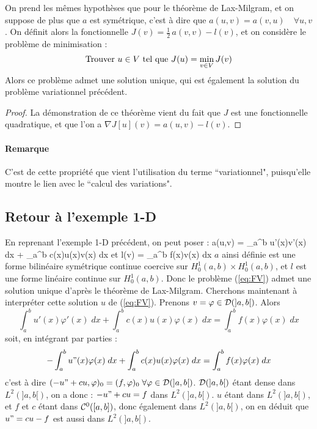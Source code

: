 %
%
\begin{theorem}
  On prend les mêmes hypothèses que pour le théorème de Lax-Milgram,
  et on suppose de plus que $a$ est symétrique, c'est \`a dire que
  $a(u,v)=a(v,u)\quad\forall u,v$. On définit alors la fonctionnelle $
  J(v)=\frac{1}{2}\, a(v,v)-l(v)$, et on considère le problème de
  minimisation :
  $$
  \hbox{Trouver } u\in V \hbox{ tel que } J(u) = \min_{v\in V} J(v)
  $$
  Alors ce problème admet une solution unique, qui est également la solution
  du problème variationnel précédent.\label{thr:13}
  \begin{proof}
    La démonstration de ce théorème vient du fait que $J$ est une fonctionnelle quadratique, et que l'on a $\nabla J[u](v) = a(u,v) - l(v)$.
  \end{proof}
\end{theorem}

\paragraph{Remarque}
\label{sec:remarque}

C'est de cette propriété que vient l'utilisation du terme ``variationnel", puisqu'elle montre le lien avec le ``calcul des variations".
%
%
%
%
\subsection{Retour \`a l'exemple 1-D}
\label{sec:modele-1D2}
%
\noindent
%
En reprenant l'exemple 1-D précédent, on peut  poser :
\be
a(u,v) = \int_a^b u'(x)v'(x)\; dx + \int_a^b c(x)u(x)v(x)\; dx
\ee
et
\be
l(v) = \int_a^b f(x)v(x)\; dx
\ee
%
$a$ ainsi définie est une forme bilinéaire symétrique continue coercive
sur $H^1_0(a,b) \times H^1_0(a,b)$, et $l$ est une forme linéaire continue
sur $H^1_0(a,b)$. Donc le problème (\ref{eq:FV}) admet une solution unique
d'après le théorème de Lax-Milgram.\saut
%
Cherchons maintenant \`a interpréter cette solution $u$ de
(\ref{eq:FV}). Prenons $v=\varphi \in {\cal D}(]a,b[)$. Alors
$$
\int_a^b u'(x)\varphi'(x)\; dx + \int_a^b c(x)u(x)\varphi(x)\; dx = \int_a^b f(x)\varphi(x)\; dx
$$
soit, en intégrant par parties :
$$
- \int_a^b u"(x)\varphi(x)\; dx + \int_a^b c(x)u(x)\varphi(x)\; dx = \int_a^b f(x)\varphi(x)\; dx
$$
c'est \`a dire $(-u"+cu,\varphi)_0 = (f,\varphi)_0\; \forall \varphi \in {\cal
D}(]a,b[)$.  ${\cal D}(]a,b[)$ étant dense dans $L^2(]a,b[)$, on a donc :
$-u"+cu=f$ dans $L^2(]a,b[)$. $u$ étant dans $L^2(]a,b[)$, et $f$ et $c$
étant dans ${\cal C}^0([a,b])$, donc également dans $L^2(]a,b[)$, on  en
déduit que $u"=cu-f$ est aussi dans $L^2(]a,b[)$.

